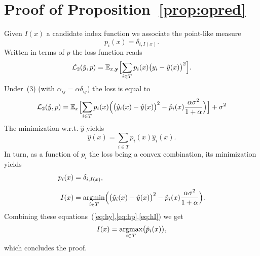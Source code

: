 \chapter{Proof of Proposition~\ref{prop:opred}}\label{app:opred}
Given $I(x)$ a candidate index function we associate the point-like measure
\[
p_i(x) = \delta_{i,I(x)}.
\]
Written in terms of $p$ the loss function reads
\[
{\cal L}_2(\hat y,p) = {\mathbb E}_{x,{\bf y}}\Bigl[\sum_{i\in T} p_i(x)\bigl(y_i-\hat y(x)\bigr)^2\Bigr].
\]
Under~(3) (with $\alpha_{ij}=\alpha\delta_{ij}$) the loss is equal to
\[
{\cal L}_2(\hat y,p) = {\mathbb E}_x\Bigl[\sum_{i\in T} p_i(x)\Bigl( \bigl(\hat y_i(x)-\hat y(x)\bigr)^2-\hat p_i(x)\frac{\alpha\sigma^2}{1+\alpha}\Bigr)\Bigr]+\sigma^2
\]
The minimization w.r.t. $\hat y$ yields
\begin{equation}\label{eq:hy}
\hat y(x) = \sum_{i\in T} p_i(x)\hat y_i(x).
\end{equation}
In turn, as a function of $p_i$ the loss being a  convex combination, its minimization yields
\begin{align}
  p_i(x) &= \delta_{i,I(x)},\label{eq:hp}\\[0.2cm]
  I(x) &= \operatorname*{argmin}_{i\in T}\Bigl(\bigl(\hat y_i(x)-\hat y(x)\bigr)^2-\hat p_i(x)\frac{\alpha\sigma^2}{1+\alpha}\Bigr).\label{eq:hI}
\end{align}
Combining these equations~(\ref{eq:hy},\ref{eq:hp},\ref{eq:hI}) we get
\[
I(x) = \operatorname*{argmax}_{i\in T}\bigl(\hat p_i(x)\bigr),
\]
which concludes the proof.  
